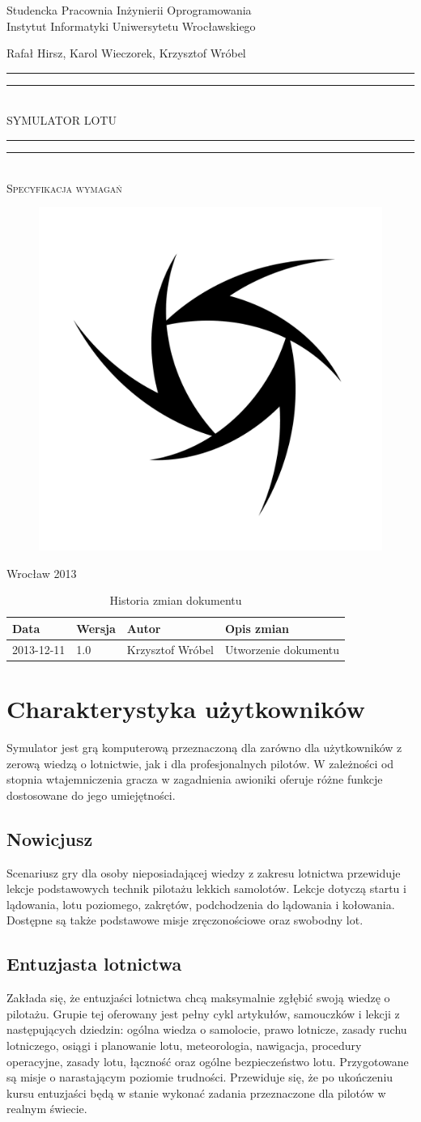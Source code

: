 \documentclass{mwrep}
\newcommand*{\titleGP}{\begingroup
\centering

{\large Studencka Pracownia Inżynierii Oprogramowania}\\Instytut Informatyki Uniwersytetu Wrocławskiego\par
\vspace*{16\baselineskip}

{\Large Rafał Hirsz, Karol Wieczorek, Krzysztof Wróbel\par}
\vspace*{\baselineskip}

\rule{\textwidth}{1.6pt}\vspace*{-\baselineskip}\vspace*{2pt}
\rule{\textwidth}{0.4pt}\\[\baselineskip]

{\Huge SYMULATOR LOTU}\\[0.2\baselineskip]

\rule{\textwidth}{0.4pt}\vspace*{-\baselineskip}\vspace{3.2pt}
\rule{\textwidth}{1.6pt}\\[\baselineskip]

\scshape
{\huge Specyfikacja wymagań}\par
\vspace*{2\baselineskip}

\begin{figure}[h]
\centering
\includegraphics[width=5\baselineskip]{flightsim-team-logo.pdf}
\end{figure}
\vfill

{\large Wrocław 2013}\par

\pagebreak

\endgroup}
\begin{document}
\thispagestyle{empty}
\titleGP

\begin{center}
\begin{table}[h]
\begin{center}
\begin{tabularx}{1\textwidth}{|l|l|l|X|}
\hline
Data & Wersja & Autor & Opis zmian \\ \hline
2013-12-11 & 1.0 & Krzysztof Wróbel & Utworzenie dokumentu \\
\hline
\end{tabularx}
\end{center}
\vspace{3ex}
\caption{Historia zmian dokumentu}\label{T:Zmiany}
\end{table}
\end{center}

\pagebreak

\tableofcontents

\chapter{Charakterystyka użytkowników}

Symulator jest grą komputerową przeznaczoną dla zarówno dla użytkowników z zerową wiedzą o lotnictwie, jak i dla profesjonalnych pilotów. W zależności od stopnia wtajemniczenia gracza w zagadnienia awioniki oferuje różne funkcje dostosowane do jego umiejętności.

\section{Nowicjusz}

Scenariusz gry dla osoby nieposiadającej wiedzy z zakresu lotnictwa przewiduje lekcje podstawowych technik pilotażu lekkich samolotów. Lekcje dotyczą startu i lądowania, lotu poziomego, zakrętów, podchodzenia do lądowania i kołowania. Dostępne są także podstawowe misje zręczonościowe oraz swobodny lot.

\section{Entuzjasta lotnictwa}

Zakłada się, że entuzjaści lotnictwa chcą maksymalnie zgłębić swoją wiedzę o pilotażu. Grupie tej oferowany jest pełny cykl artykułów, samouczków i lekcji z następujących dziedzin: ogólna wiedza o samolocie, prawo lotnicze, zasady ruchu lotniczego, osiągi i planowanie lotu, meteorologia, nawigacja, procedury operacyjne, zasady lotu, łączność oraz ogólne bezpieczeństwo lotu. Przygotowane są misje o narastającym poziomie trudności. Przewiduje się, że po ukończeniu kursu entuzjaści będą w stanie wykonać zadania przeznaczone dla pilotów w realnym świecie.
\end{document}
